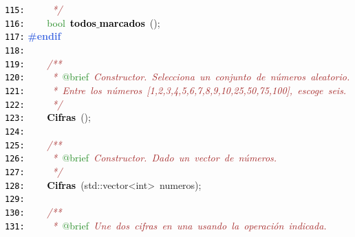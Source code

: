 \documentclass[a4paper,10pt]{scrartcl}
\begin{document}
{   \mbox{}\texttt{\textcolor{Black}{115:}} \textit{\textcolor{Brown}{\ \ \ \ \ */}} \\
   \mbox{}\texttt{\textcolor{Black}{116:}} \ \ \ \ \textcolor{ForestGreen}{bool}\ \textbf{\textcolor{Black}{todos$\_$marcados}}\ \textcolor{BrickRed}{();} \\
   \mbox{}\texttt{\textcolor{Black}{117:}} \textbf{\textcolor{RoyalBlue}{\#endif}} \\
   \mbox{}\texttt{\textcolor{Black}{118:}} \ \  \\
   \mbox{}\texttt{\textcolor{Black}{119:}} \ \ \ \ \textit{\textcolor{Brown}{/**}} \\
   \mbox{}\texttt{\textcolor{Black}{120:}} \textit{\textcolor{Brown}{\ \ \ \ \ *\ }}\textcolor{ForestGreen}{@brief}\textit{\textcolor{Brown}{\ Constructor.\ Selecciona\ un\ conjunto\ de\ números\ aleatorio.}} \\
   \mbox{}\texttt{\textcolor{Black}{121:}} \textit{\textcolor{Brown}{\ \ \ \ \ *\ Entre\ los\ números\ [1,2,3,4,5,6,7,8,9,10,25,50,75,100],\ escoge\ seis.}} \\
   \mbox{}\texttt{\textcolor{Black}{122:}} \textit{\textcolor{Brown}{\ \ \ \ \ */}} \\
   \mbox{}\texttt{\textcolor{Black}{123:}} \ \ \ \ \textbf{\textcolor{Black}{Cifras}}\ \textcolor{BrickRed}{();} \\
   \mbox{}\texttt{\textcolor{Black}{124:}} \ \  \\
   \mbox{}\texttt{\textcolor{Black}{125:}} \ \ \ \ \textit{\textcolor{Brown}{/**}} \\
   \mbox{}\texttt{\textcolor{Black}{126:}} \textit{\textcolor{Brown}{\ \ \ \ \ *\ }}\textcolor{ForestGreen}{@brief}\textit{\textcolor{Brown}{\ Constructor.\ Dado\ un\ vector\ de\ números.}} \\
   \mbox{}\texttt{\textcolor{Black}{127:}} \textit{\textcolor{Brown}{\ \ \ \ \ */}} \\
   \mbox{}\texttt{\textcolor{Black}{128:}} \ \ \ \ \textbf{\textcolor{Black}{Cifras}}\ \textcolor{BrickRed}{(}std\textcolor{BrickRed}{::}\textcolor{TealBlue}{vector\textless{}int\textgreater{}}\ numeros\textcolor{BrickRed}{);} \\
   \mbox{}\texttt{\textcolor{Black}{129:}} \ \  \\
   \mbox{}\texttt{\textcolor{Black}{130:}} \ \ \ \ \textit{\textcolor{Brown}{/**}} \\
   \mbox{}\texttt{\textcolor{Black}{131:}} \textit{\textcolor{Brown}{\ \ \ \ \ *\ }}\textcolor{ForestGreen}{@brief}\textit{\textcolor{Brown}{\ Une\ dos\ cifras\ en\ una\ usando\ la\ operación\ indicada.}} \\
}
\end{document}
